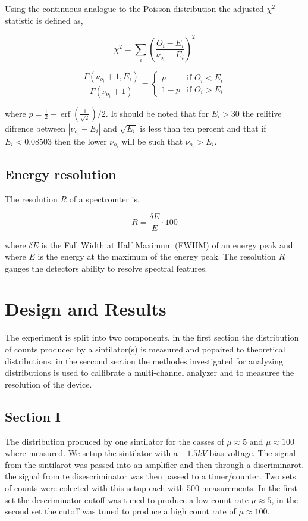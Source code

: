 \documentclass[%
 reprint,
 amsmath,amssymb,
 aps,
]{revtex4-1}
\begin{document}
Using the continuous analogue to the Poisson distribution the adjusted $\chi^2$ statistic is defined as,

\[
\chi^2 = \sum_i \left(\frac{O_i - E_i}{\nu_{o_i} - E_i}\right)^2
\]

\[
\frac{\Gamma(\nu_{o_i}+1, E_i)}{\Gamma(\nu_{o_i} + 1)} = \begin{cases}
p & \text{if $O_i < E_i$}\\
1 - p & \text{if $O_i > E_i$}
\end{cases}
\]

where $p=\frac{1}{2} - \operatorname{erf}({\frac{1}{\sqrt{2}}})/2$. It should be noted that for $E_i > 30$ the relitive difrence between $\left|\nu_{o_i}-E_i\right|$ and $\sqrt{E_i}$ is less than ten percent and that if $E_i < 0.08503$ then the lower $\nu_{o_i}$ will be such that $\nu_{o_i} > E_i$.

\subsection{Energy resolution}
The resolution $R$ of a spectromter is,

\begin{equation}
R = \frac{\delta E}{E}\cdot100
\label{energy_resolution}
\end{equation}

where $\delta E$ is the Full Width at Half Maximum (FWHM) of an energy peak and where $E$ is the energy at the maximum of the energy peak. The resolution $R$ gauges the detectors ability to resolve spectral features.

\section{Design and Results}
The experiment is split into two components, in the first section the distribution of counts produced by a sintilator(s) is measured and popaired to theoretical distributions, in the seccond section the methodes investigated for analyzing distributions is used to callibrate a multi-channel analyzer and  to measuree the resolution of the device.

\subsection{Section I}
The distribution produced by one sintilator for the casses of $\mu\approx5$ and $\mu\approx100$ where measured. We setup the sintilator with a $-1.5kV$ bias voltage. The signal from the sintilarot was passed into an amplifier and then through a discriminarot. the signal from te disescriminator was then passed to a timer/counter. Two sets of counts were colected with this setup each with 500 measurements. In the first set the descriminator cutoff was tuned to produce a low count rate $\mu\approx5$, in the second set the cutoff was tuned to produce a high count rate of $\mu\approx100$.
\end{document}
